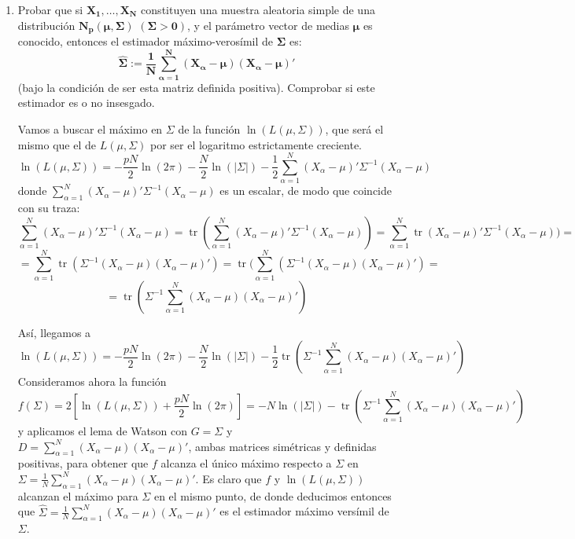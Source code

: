 \documentclass[11pt,a4paper]{article}
\begin{document}
\begin{enumerate}[label=\arabic*.]
\newpage
\bfseries
\item Probar que si $\mathbf{X_{1}, \dots, X_{N}}$ constituyen una muestra aleatoria simple de una distribución $\mathbf{N_{p}(\mu, \Sigma)}$ $\mathbf{(\Sigma > 0)}$, y el parámetro vector de medias $\mathbf{\mu}$ es conocido, entonces el estimador máximo-verosímil de $\mathbf{\Sigma}$ es:
$$\mathbf{\hat{\Sigma} := \frac{1}{N} \sum_{\alpha=1}^{N} (X_{\alpha} - \mu)(X_{\alpha} - \mu)'}$$
(bajo la condición de ser esta matriz definida positiva). Comprobar si este estimador es o no insesgado.

\vspace{0.5cm}
\normalfont

Vamos a buscar el máximo en $\Sigma$ de la función $\ln(L(\mu, \Sigma))$, que será el mismo que el de $L(\mu, \Sigma)$ por ser el logaritmo estrictamente creciente.
$$\ln(L(\mu, \Sigma)) = -\frac{pN}{2}\ln(2\pi) - \frac{N}{2}\ln(|\Sigma|) - \frac{1}{2}\sum_{\alpha=1}^{N} (X_{\alpha} - \mu)' \Sigma^{-1} (X_{\alpha} - \mu)$$
donde $\sum_{\alpha=1}^{N} (X_{\alpha} - \mu)' \Sigma^{-1} (X_{\alpha} - \mu)$ es un escalar, de modo que coincide con su traza:
$$\sum_{\alpha=1}^{N} (X_{\alpha} - \mu)' \Sigma^{-1} (X_{\alpha} - \mu) = \operatorname{tr} (\sum_{\alpha=1}^{N} (X_{\alpha} - \mu)' \Sigma^{-1} (X_{\alpha} - \mu)) = \sum_{\alpha=1}^{N} \operatorname{tr} (X_{\alpha}-\mu)' \Sigma^{-1} (X_{\alpha}-\mu)) =$$
$$= \sum_{\alpha=1}^{N} \operatorname{tr}(\Sigma^{-1}(X_{\alpha} - \mu)(X_{\alpha} - \mu)') = \operatorname{tr}(\sum_{\alpha=1}^{N}(\Sigma^{-1}(X_{\alpha}-\mu)(X_{\alpha}-\mu)') =$$
$$= \operatorname{tr}(\Sigma^{-1} \sum_{\alpha=1}^{N} (X_{\alpha}-\mu)(X_{\alpha}-\mu)')$$

Así, llegamos a
$$\ln(L(\mu, \Sigma)) = -\frac{pN}{2} \ln(2\pi) - \frac{N}{2} \ln(|\Sigma|) - \frac{1}{2} \operatorname{tr}(\Sigma^{-1} \sum_{\alpha=1}^{N} (X_{\alpha}-\mu)(X_{\alpha}-\mu)')$$
Consideramos ahora la función
$$f(\Sigma) = 2[\ln(L(\mu, \Sigma)) + \frac{pN}{2}\ln(2\pi)] = -N\ln(|\Sigma|) - \operatorname{tr}(\Sigma^{-1} \sum_{\alpha=1}^{N}(X_{\alpha}-\mu)(X_{\alpha}-\mu)')$$
y aplicamos el lema de Watson con $G = \Sigma$ y $D = \sum_{\alpha=1}^{N}(X_{\alpha}-\mu)(X_{\alpha}-\mu)'$, ambas matrices simétricas y definidas positivas, para obtener que $f$ alcanza el único máximo respecto a $\Sigma$ en $\Sigma = \frac{1}{N} \sum_{\alpha=1}^{N}(X_{\alpha}-\mu)(X_{\alpha}-\mu)'$. Es claro que $f$ y $\ln(L(\mu, \Sigma))$ alcanzan el máximo para $\Sigma$ en el mismo punto, de donde deducimos entonces que $\hat{\Sigma} = \frac{1}{N} \sum_{\alpha=1}^{N} (X_{\alpha}-\mu)(X_{\alpha}-\mu)'$ es el estimador máximo versímil de $\Sigma$.


\end{enumerate}
\end{document}
